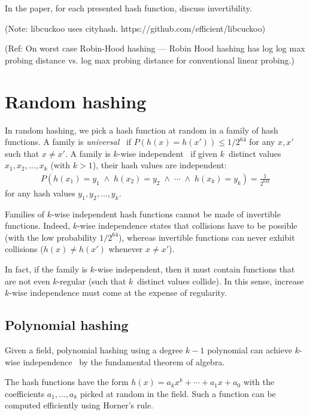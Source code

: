 \documentclass{article}
\begin{document}
In the paper, for each presented hash function, discuss invertibility.



(Note: libcuckoo uses cityhash. https://github.com/efficient/libcuckoo)

(Ref: On worst case Robin-Hood hashing --- Robin Hood hashing has log log max probing distance vs. log max probing distance
for conventional linear probing.)

\section{Random hashing}


In random hashing, 
we pick a hash function  at random in a family of
hash functions.  A family  is
  \emph{universal}~\cite{carter1979universal} if
 $P\left (h(x)=h(x')\right )\leq 1/2^{64}$
for any $x,x'$ such that $x \neq x'$.
A family is $k$-wise independent~\cite{lemi:one-pass-journal,Lemire2012604} if given  $k$~distinct values $x_1,x_2, \ldots, x_k$ (with $k>1$), their hash
values are independent: \begin{eqnarray*}
P\left (h(x_1)= y_1  \; \land  \; h(x_2)= y_2 \; \land  \; \cdots \; \land  \; h(x_k)= y_k  \right ) =\frac{1}{2^{64k}}\end{eqnarray*}
for any hash values $y_1,y_2,\ldots, y_k$. 


Families of $k$-wise independent hash functions cannot be made of invertible functions. Indeed, $k$-wise independence states that collisions have to be possible (with the low probability $1/2^{64}$), whereas invertible functions can never exhibit collisions ($h(x) \neq h(x')$ whenever $x\neq x'$).

In fact, if the family is $k$-wise independent, then it must contain functions that are not even $k$-regular (such that $k$~distinct values collide). In this sense, increase $k$-wise independence must come at the expense of regularity.

\subsection{Polynomial hashing}
Given a field, polynomial hashing using a degree $k-1$ polynomial can achieve $k$-wise independence~\cite{carter1979universal,Thorup:2004:TBH:982792.982884} by the fundamental theorem of algebra.

The hash functions have the form $h(x)=a_{k} x^{k} + \cdots + a_{1} x + a_0$ with the coefficients $a_1, \ldots, a_k$ picked at random in the field. Such a function can be computed efficiently using Horner's rule.
\end{document}
